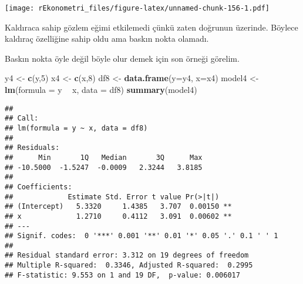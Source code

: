 \documentclass[
]{book}
\newenvironment{Shaded}{\begin{snugshade}}{\end{snugshade}}
\newcommand{\DataTypeTok}[1]{\textcolor[rgb]{0.13,0.29,0.53}{#1}}
\newcommand{\DecValTok}[1]{\textcolor[rgb]{0.00,0.00,0.81}{#1}}
\newcommand{\KeywordTok}[1]{\textcolor[rgb]{0.13,0.29,0.53}{\textbf{#1}}}
\newcommand{\NormalTok}[1]{#1}
\newcommand{\OperatorTok}[1]{\textcolor[rgb]{0.81,0.36,0.00}{\textbf{#1}}}
\newcommand{\StringTok}[1]{\textcolor[rgb]{0.31,0.60,0.02}{#1}}
\begin{document}
\texttt{[image: rEkonometri\_files/figure-latex/unnamed-chunk-156-1.pdf]}

Kaldıraca sahip gözlem eğimi etkilemedi çünkü zaten doğrunun üzerinde. Böylece kaldıraç özelliğine sahip oldu ama baskın nokta olamadı.

Baskın nokta öyle değil böyle olur demek için son örneği görelim.

\begin{Shaded}
\begin{Highlighting}[]
\NormalTok{y4 <-}\StringTok{ }\KeywordTok{c}\NormalTok{(y,}\DecValTok{5}\NormalTok{)}
\NormalTok{x4 <-}\StringTok{ }\KeywordTok{c}\NormalTok{(x,}\DecValTok{8}\NormalTok{)}
\NormalTok{df8 <-}\StringTok{ }\KeywordTok{data.frame}\NormalTok{(}\DataTypeTok{y=}\NormalTok{y4, }\DataTypeTok{x=}\NormalTok{x4)}
\NormalTok{model4 <-}\StringTok{ }\KeywordTok{lm}\NormalTok{(}\DataTypeTok{formula =}\NormalTok{ y }\OperatorTok{~}\StringTok{ }\NormalTok{x, }\DataTypeTok{data =}\NormalTok{ df8)}
\KeywordTok{summary}\NormalTok{(model4)}
\end{Highlighting}
\end{Shaded}

\begin{verbatim}
## 
## Call:
## lm(formula = y ~ x, data = df8)
## 
## Residuals:
##      Min       1Q   Median       3Q      Max 
## -10.5000  -1.5247  -0.0009   2.3244   3.8185 
## 
## Coefficients:
##             Estimate Std. Error t value Pr(>|t|)   
## (Intercept)   5.3320     1.4385   3.707  0.00150 **
## x             1.2710     0.4112   3.091  0.00602 **
## ---
## Signif. codes:  0 '***' 0.001 '**' 0.01 '*' 0.05 '.' 0.1 ' ' 1
## 
## Residual standard error: 3.312 on 19 degrees of freedom
## Multiple R-squared:  0.3346, Adjusted R-squared:  0.2995 
## F-statistic: 9.553 on 1 and 19 DF,  p-value: 0.006017
\end{verbatim}
\end{document}
